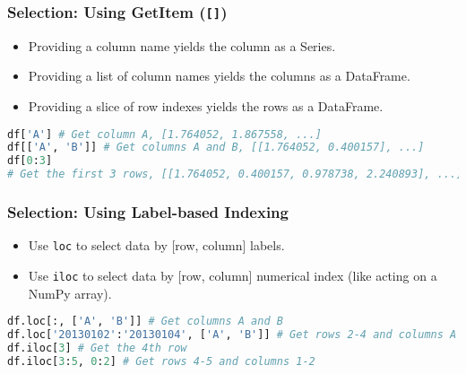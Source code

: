 \documentclass[beamer, en, version=2.0]{huangfusl-template}
\begin{document}
    \begin{frame}[fragile]
        \frametitle{Selection: Using GetItem ({\normalsize\texttt{[]}})}

        \begin{itemize}
            \item Providing a column name yields the column as a Series.
            \item Providing a list of column names yields the columns as a DataFrame.
            \item Providing a slice of row indexes yields the rows as a DataFrame.
        \end{itemize}

\begin{lstlisting}[language=python]
df['A'] # Get column A, [1.764052, 1.867558, ...]
df[['A', 'B']] # Get columns A and B, [[1.764052, 0.400157], ...]
df[0:3]
# Get the first 3 rows, [[1.764052, 0.400157, 0.978738, 2.240893], ...]
\end{lstlisting}

    \end{frame}

    \begin{frame}[fragile]
        \frametitle{Selection: Using Label-based Indexing}

        \begin{itemize}
            \item Use {\color{blue}\footnotesize\verb|loc|} to select data by [row, column] labels.
            \item Use {\color{blue}\footnotesize\verb|iloc|} to select data by [row, column] numerical index (like acting on a NumPy array).
        \end{itemize}

\begin{lstlisting}[language=python]
df.loc[:, ['A', 'B']] # Get columns A and B
df.loc['20130102':'20130104', ['A', 'B']] # Get rows 2-4 and columns A and B
df.iloc[3] # Get the 4th row
df.iloc[3:5, 0:2] # Get rows 4-5 and columns 1-2
\end{lstlisting}
    \end{frame}
\end{document}
